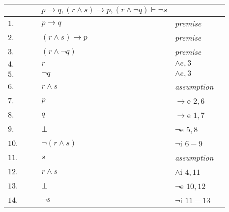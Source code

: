 \documentclass[12pt]{article}
\begin{document}
\begin{table}[H]
	\centering

	\begin{tabular}{*6{l}}
        $ $ & & & $ p \rightarrow q,(r \wedge s) \rightarrow p,(r \wedge \neg q) \vdash \neg s  $ & &\\
        \hline
        \hline

		$1.$ & & & $ p \rightarrow q $ & \textit{premise} & \\

		$2.$ & & & $(r \wedge s) \rightarrow p $ &\textit{premise} &\\

		$3.$ & & & $(r \wedge \neg q) $ &\textit{premise} &\\

		$4.$ & & & $ r $ &\textit{$\wedge e,3$} &\\

		$5.$ & & & $ \neg q $ &\textit{$\wedge e,3$} &\\ \cline{2-6}

		$6.$ &\multicolumn{1}{|c}{}& & $r \wedge s$ & {\textit{assumption}} & \multicolumn{1}{c|}{}\\

		$7.$ &\multicolumn{1}{|c}{} & & $p $ & $\rightarrow$e $2,6$ & \multicolumn{1}{c|}{}\\

		$8.$ &\multicolumn{1}{|c}{} & & $q $ & $\rightarrow$e $1,7$ & \multicolumn{1}{c|}{}\\

		$9.$ &\multicolumn{1}{|c}{}& & $ \bot$ & {$\neg$e $5,8$}&\multicolumn{1}{c|}{}\\\cline{2-6}

		$10.$ & & & $\neg(r\wedge s)$ & {$\neg$i $6-9$}& \\ \cline{2-6}

		$11.$ &\multicolumn{1}{|c}{}& &$s$ & {\textit{assumption}} &\multicolumn{1}{c|}{}\\

		$12.$ &\multicolumn{1}{|c}{}& & $r\wedge s$ & $\wedge$i $4,11$ & \multicolumn{1}{c|}{}\\

		$13.$ &\multicolumn{1}{|c}{} & & $\bot$ & {$\neg$e $10,12$} & \multicolumn{1}{c|}{}\\ \cline{2-6}

		$14.$ & & & $\neg s$ & {$\neg$i $11-13$} & \\

	\end{tabular}
\end{table}
\end{document}
